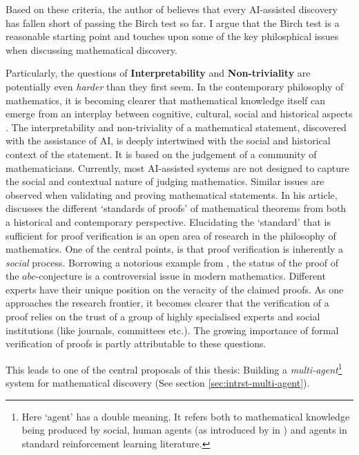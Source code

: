 Based on these criteria, the author of \cite{heTrium2024} believes that every AI-assisted discovery has fallen short of passing the Birch test so far. I argue that the Birch test is a reasonable starting point and touches upon some of the key philosphical issues when discussing mathematical discovery.
\par 
Particularly, the questions of \textbf{Interpretability} and \textbf{Non-triviality} are potentially even \textit{harder} than they first seem. In the contemporary philosophy of mathematics, it is becoming clearer that mathematical knowledge itself can emerge from an interplay between cognitive, cultural, social and historical aspects \cite{mathKnowledgeInterplayPractices2016}. The interpretability and non-triviality of a mathematical statement, discovered with the assistance of AI, is deeply intertwined with the social and historical context of the statement. It is based on the judgement of a community of mathematicians.
Currently, most AI-assisted systems are not designed to capture the social and contextual nature of judging mathematics. Similar issues are observed when validating and proving mathematical statements.
In his \citeyear{ochigameAutomatedMathematicsReconfiguration2024} article, \citeauthor{ochigameAutomatedMathematicsReconfiguration2024} \cite{ochigameAutomatedMathematicsReconfiguration2024} discusses the different `standards of proofs' of mathematical theorems from both a historical and contemporary perspective. Elucidating the `standard' that is sufficient for proof verification is an open area of research in the philosophy of mathematics. One of the central points, is that proof verification is inherently a \textit{social} process.
Borrowing a notorious example from \citeauthor{ochigameAutomatedMathematicsReconfiguration2024}, the status of the proof of the $abc$-conjecture \cite{masser1985open} is a controversial issue in modern mathematics. Different experts have their unique position on the veracity of the claimed proofs. As one approaches the research frontier, it becomes clearer that the verification of a proof relies on the trust of a group of highly specialised experts and social institutions (like journals, committees etc.). The growing importance of formal verification of proofs is partly attributable to these questions.
\par This leads to one of the central proposals of this thesis: Building a \textit{multi-agent}\footnote[1]{Here `agent' has a double meaning. It refers both to mathematical knowledge being produced by social, human agents (as introduced by \citeauthor{mathKnowledgeInterplayPractices2016} in \cite{mathKnowledgeInterplayPractices2016}) and agents in standard reinforcement learning literature.} system for mathematical discovery (See section \ref{sec:intrst-multi-agent}). 

